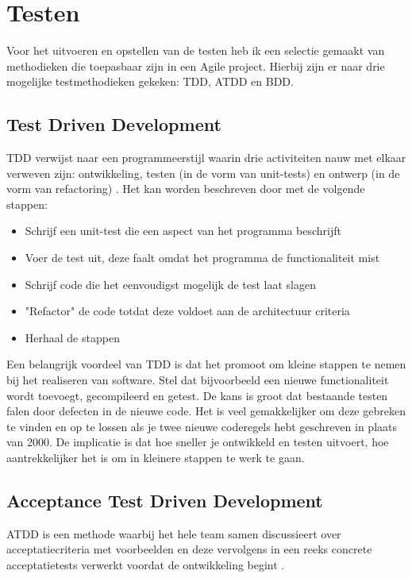 \section{Testen}

Voor het uitvoeren en opstellen van de testen heb ik een selectie gemaakt van methodieken die toepasbaar zijn in een Agile project. Hierbij zijn er naar drie mogelijke testmethodieken gekeken: \acrfull{TDD}, \acrfull{ATDD} en \acrfull{BDD}.

\subsection{Test Driven Development}
\acrshort{TDD} verwijst naar een programmeerstijl waarin drie activiteiten nauw met elkaar verweven zijn: ontwikkeling, testen (in de vorm van unit-tests) en ontwerp (in de vorm van refactoring) \citep{janzen2005test}.
Het kan worden beschreven door met de volgende stappen:

\begin{itemize}[noitemsep]
    \item Schrijf een unit-test die een aspect van het programma beschrijft
    \item Voer de test uit, deze faalt omdat het programma de functionaliteit mist
    \item Schrijf code die het eenvoudigst mogelijk de test laat slagen
    \item "Refactor" de code totdat deze voldoet aan de architectuur criteria
    \item Herhaal de stappen
\end{itemize}

Een belangrijk voordeel van \acrshort{TDD} is dat het promoot om kleine stappen te nemen bij het realiseren van software. Stel dat bijvoorbeeld een nieuwe functionaliteit wordt toevoegt, gecompileerd en getest. De kans is groot dat bestaande testen falen door defecten in de nieuwe code. Het is veel gemakkelijker om deze gebreken te vinden en op te lossen als je twee nieuwe coderegels hebt geschreven in plaats van 2000. De implicatie is dat hoe sneller je ontwikkeld en testen uitvoert, hoe aantrekkelijker het is om in kleinere stappen te werk te gaan.

\subsection{Acceptance Test Driven Development}
\acrshort{ATDD} is een methode waarbij het hele team samen discussieert over acceptatiecriteria met voorbeelden en deze vervolgens in een reeks concrete acceptatietests verwerkt voordat de ontwikkeling begint \citep{aggarwal2014acceptance}.


